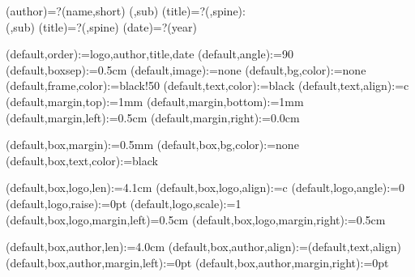 
%


\makeatletter




\spine(author)=?{\thedocauthor(name,short)}
(\@LANG@COVER,sub){%
  \spine(title)=?{\thedoctitle(\@LANG@COVER,spine):\\\thedoctitle(\@LANG@COVER,sub)}
}{%
  \spine(title)=?{\thedoctitle(\@LANG@COVER,spine)}
}
\spine(date)=?{\thentdocdate(year)}


\spine(default,order):={logo,author,title,date}
\spine(default,angle):={90}
\spine(default,boxsep):={0.5cm}
\spine(default,image):={none}
\spine(default,bg,color):={none}
\spine(default,frame,color):={black!50}
\spine(default,text,color):={black}
\spine(default,text,align):={c}
\spine(default,margin,top):={1mm}
\spine(default,margin,bottom):={1mm}
\spine(default,margin,left):={0.5cm}
\spine(default,margin,right):={0.0cm}

\spine(default,box,margin):={0.5mm}
\spine(default,box,bg,color):={none}
\spine(default,box,text,color):={black}

\spine(default,box,logo,len):={4.1cm}
\spine(default,box,logo,align):={c}
\spine(default,logo,angle):={0}
\spine(default,logo,raise):={0pt}
\spine(default,logo,scale):={1}
\spine(default,box,logo,margin,left)={0.5cm}
\spine(default,box,logo,margin,right):={0.5cm}

\spine(default,box,author,len):={4.0cm}
\spine(default,box,author,align):={\thespine(default,text,align)}
\spine(default,box,author,margin,left):={0pt}
\spine(default,box,author,margin,right):={0pt}

